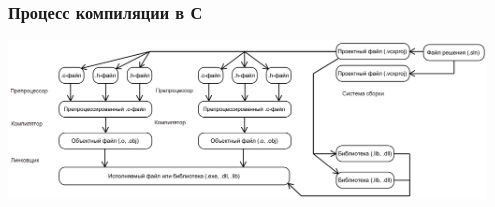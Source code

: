 \documentclass[xetex,mathserif,serif]{beamer}
\begin{document}
    \begin{frame}
        \frametitle{Процесс компиляции в С}
        \begin{center}
            \includegraphics[width=0.95\textwidth]{compilation.png}
        \end{center}
    \end{frame}
\end{document}
